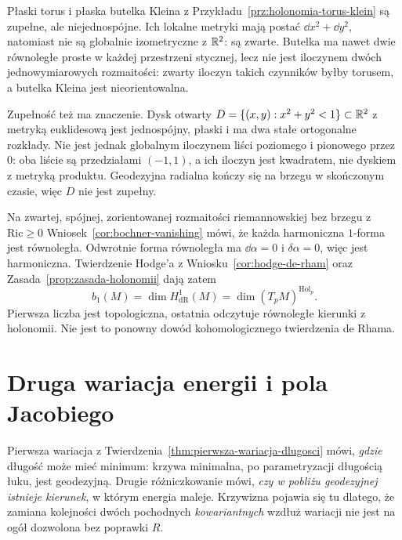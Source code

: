 \begin{przyklad}
\label{prz:de-rham-zalozenia}
Płaski torus i płaska butelka Kleina z
Przykładu~\ref{prz:holonomia-torus-klein} są zupełne,
ale niejednospójne. Ich lokalne metryki mają postać
$\dd x^2+\dd y^2$, natomiast nie są globalnie
izometryczne z $\mathbb{R}^2$: są zwarte. Butelka ma nawet
dwie równoległe proste w każdej przestrzeni stycznej,
lecz nie jest iloczynem dwóch jednowymiarowych
rozmaitości: zwarty iloczyn takich czynników byłby
torusem, a butelka Kleina jest nieorientowalna.

Zupełność też ma znaczenie. Dysk otwarty
$D=\{(x,y):x^2+y^2<1\}\subset\mathbb{R}^2$ z metryką
euklidesową jest jednospójny, płaski i ma dwa stałe
ortogonalne rozkłady. Nie jest jednak globalnym
iloczynem liści poziomego i pionowego przez $0$:
oba liście są przedziałami $(-1,1)$, a ich iloczyn
jest kwadratem, nie dyskiem z metryką produktu.
Geodezyjna radialna kończy się na brzegu w skończonym
czasie, więc $D$ nie jest zupełny.
\end{przyklad}

\begin{uwaga}
\label{uwaga:holonomia-bochner}
Na zwartej, spójnej, zorientowanej rozmaitości
riemannowskiej bez brzegu z $\mathrm{Ric}\geq0$
Wniosek~\ref{cor:bochner-vanishing} mówi, że każda
harmoniczna $1$-forma jest równoległa. Odwrotnie
forma równoległa ma $\dd\alpha=0$ i $\delta\alpha=0$,
więc jest harmoniczna. Twierdzenie Hodge'a
z Wniosku~\ref{cor:hodge-de-rham} oraz
Zasada~\ref{prop:zasada-holonomii} dają zatem
\[
 b_1(M)=\dim H^1_{\mathrm{dR}}(M)
       =\dim (T_pM)^{\operatorname{Hol}_p}.
\]
Pierwsza liczba jest topologiczna, ostatnia odczytuje
równoległe kierunki z holonomii. Nie jest to ponowny
dowód kohomologicznego twierdzenia de Rhama.
\end{uwaga}

\section{Druga wariacja energii i pola Jacobiego}
\label{sec:druga-wariacja-jacobi}

Pierwsza wariacja z
Twierdzenia~\ref{thm:pierwsza-wariacja-dlugosci}
mówi, \emph{gdzie} długość może mieć minimum:
krzywa minimalna, po parametryzacji długością łuku,
jest geodezyjną. Drugie różniczkowanie mówi,
\emph{czy w pobliżu geodezyjnej istnieje kierunek},
w którym energia maleje. Krzywizna pojawia się
tu dlatego, że zamiana kolejności dwóch pochodnych
\emph{kowariantnych} wzdłuż wariacji nie jest
na ogół dozwolona bez poprawki $R$.

